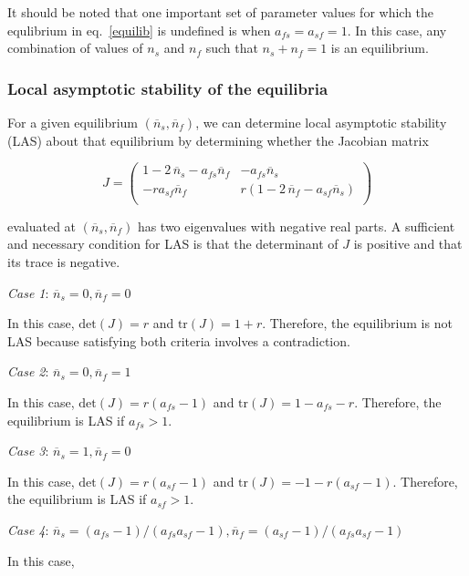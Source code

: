 \documentclass[11pt]{article}
\begin{document}
\noindent It should be noted that one important set of parameter values for which the equlibrium in eq.~\eqref{equilib} is undefined is when $a_{fs} = a_{sf} = 1$. In this case, any combination of values of $n_s$ and $n_f$ such that $n_s + n_f = 1$ is an equilibrium.

\subsubsection*{Local asymptotic stability of the equilibria}

For a given equilibrium $(\overline{n}_s,\overline{n}_f)$, we can determine local asymptotic stability (LAS) about that equilibrium by determining whether the Jacobian matrix

\begin{equation}
J = \left( \begin{array}{cc}
	1-2\,\overline{n}_s-a_{fs}\overline{n}_f & -a_{fs}\overline{n}_s \\
	-ra_{sf}\overline{n}_f & r(1-2\,\overline{n}_f-a_{sf}\overline{n}_s) \\
	\end{array} \right)
\end{equation}

\noindent evaluated at $(\overline{n}_s,\overline{n}_f)$ has two eigenvalues with negative real parts. A sufficient and necessary condition for LAS is that the determinant of $J$ is positive and that its trace is negative.

\noindent \textit{Case 1}: $\overline{n}_s=0,\overline{n}_f=0$

In this case, $\textrm{det}(J)=r$ and $\textrm{tr}(J)=1+r$. Therefore, the equilibrium is not LAS because satisfying both criteria involves a contradiction.

\noindent \textit{Case 2}: $\overline{n}_s=0,\overline{n}_f=1$

In this case, $\textrm{det}(J)=r(a_{fs}-1)$ and $\textrm{tr}(J)=1-a_{fs}-r$. Therefore, the equilibrium is LAS if $a_{fs}>1$.

\noindent \textit{Case 3}: $\overline{n}_s=1,\overline{n}_f=0$

In this case, $\textrm{det}(J)=r(a_{sf}-1)$ and $\textrm{tr}(J)=-1-r(a_{sf}-1)$. Therefore, the equilibrium is LAS if $a_{sf}>1$.

\noindent \textit{Case 4}: $\overline{n}_s=(a_{fs} - 1)/(a_{fs} a_{sf} - 1),\overline{n}_f=(a_{sf} - 1)/(a_{fs} a_{sf} - 1)$

In this case, 
\end{document}
